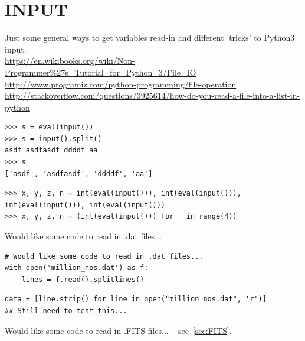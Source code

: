 \documentclass[11pt,a4paper]{article}
\begin{document}
\newpage
\section{INPUT}
Just some general ways to get variables read-in and different 'tricks' to Python3 input. \\
\href{https://en.wikibooks.org/wiki/Non-Programmer\%27s\_Tutorial\_for\_Python\_3/File\_IO}{https://en.wikibooks.org/wiki/Non-Programmer\%27s\_Tutorial\_for\_Python\_3/File\_IO}\\
\href{http://www.programiz.com/python-programming/file-operation}{http://www.programiz.com/python-programming/file-operation}\\
\href{http://stackoverflow.com/questions/3925614/how-do-you-read-a-file-into-a-list-in-python}{http://stackoverflow.com/questions/3925614/how-do-you-read-a-file-into-a-list-in-python}\\


\begin{lstlisting}
>>> s = eval(input())
>>> s = input().split()
asdf asdfasdf ddddf aa
>>> s
['asdf', 'asdfasdf', 'ddddf', 'aa']
\end{lstlisting}

\begin{lstlisting}
>>> x, y, z, n = int(eval(input())), int(eval(input())), int(eval(input())), int(eval(input()))
>>> x, y, z, n = (int(eval(input())) for _ in range(4))
\end{lstlisting}

Would like some code to read in .dat files...
\begin{lstlisting}
# Would like some code to read in .dat files...
with open('million_nos.dat') as f:
    lines = f.read().splitlines()
\end{lstlisting}

\begin{lstlisting}
data = [line.strip() for line in open("million_nos.dat", 'r')]
## Still need to test this...
\end{lstlisting}


\smallskip
\smallskip
\noindent 
Would like some code to read in .FITS files... -- see~\ref{sec:FITS}. 
\begin{lstlisting}
\end{lstlisting}
\end{document}
